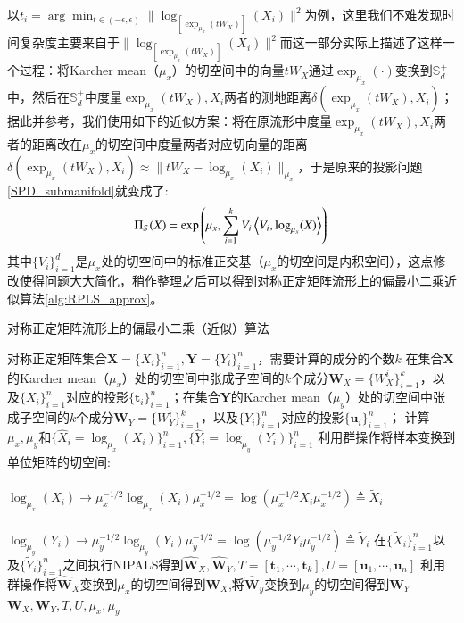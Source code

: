 以$t_i=\arg\min_{t \in (-\epsilon,\epsilon)}\|\log_{[\exp_{\mu_x}(tW_X)]}(X_i)\|^2$为例，这里我们不难发现时间复杂度主要来自于$\|\log_{[\exp_{\mu_x}(tW_X)]}(X_i)\|^2$而这一部分实际上描述了这样一个过程：将Karcher mean（$\mu_x$）的切空间中的向量$tW_X$通过$\exp_{\mu_x}(\cdot)$变换到$\mathbb{S}_{d}^{+}$中，然后在$\mathbb{S}_{d}^{+}$中度量$\exp_{\mu_x}(tW_X),X_i$两者的测地距离$\delta(\exp_{\mu_x}(tW_X),X_i)$；据此并参考\cite{PGA}，我们使用如下的近似方案：将在原流形中度量$\exp_{\mu_x}(tW_X),X_i$两者的距离改在$\mu_x$的切空间中度量两者对应切向量的距离$\delta(\exp_{\mu_x}(tW_X),X_i)\approx \|tW_X-\log_{\mu_x}(X_i)\|_{\mu_x}$，于是原来的投影问题\ref{SPD_submanifold}就变成了:
\begin{equation}
\label{tangent_approxiamte}
\Pi_{S}(X)=\exp\left(\mu_x,\sum_{i=1}^{k}V_i\left<V_i,\log_{\mu_x}(X)\right>\right)\\
\end{equation}
其中$\{V_i\}_{i=1}^{d}$是$\mu_x$处的切空间中的标准正交基（$\mu_x$的切空间是内积空间），这点修改使得问题大大简化，稍作整理之后可以得到对称正定矩阵流形上的偏最小二乘近似算法\ref{alg:RPLS_approx}。
\begin{algorithm}[htb]
\caption{对称正定矩阵流形上的偏最小二乘（近似）算法}
\label{alg:RPLS_approx}
\begin{algorithmic}[1]
\REQUIRE 对称正定矩阵集合$\bm{X}=\{X_i\}_{i=1}^{n},\bm{Y}=\{Y_i\}_{i=1}^{n}$，需要计算的成分的个数$k$
\ENSURE 在集合$\bm{X}$的Karcher mean（$\mu_x$）处的切空间中张成子空间的$k$个成分$\bm{W}_{X}=\{W_{X}^{i}\}_{i=1}^{k}$，以及$\{X_i\}_{i=1}^{n}$对应的投影$\{\bm{t}_i\}_{i=1}^{n}$；在集合$\bm{Y}$的Karcher mean（$\mu_y$）处的切空间中张成子空间的$k$个成分$\bm{W}_{Y}=\{W_{Y}^{i}\}_{i=1}^{k}$，以及$\{Y_i\}_{i=1}^{n}$对应的投影$\{\bm{u}_i\}_{i=1}^{n}$；
\STATE 计算$\mu_x, \mu_y$和$\{\hat{X}_i=\log_{\mu_{x}}(X_i)\}_{i=1}^{n}, \{\hat{Y}_i=\log_{\mu_{y}}(Y_i)\}_{i=1}^{n}$
\STATE 利用群操作将样本变换到单位矩阵的切空间:\\
~~~~~~~~~~~~~~~~~~~$\log_{\mu_{x}}(X_i)\rightarrow \mu_{x}^{-1/2}\log_{\mu_{x}}(X_i)\mu_{x}^{-1/2}=\log(\mu_{x}^{-1/2}X_i\mu_{x}^{-1/2})\triangleq \tilde{X}_i$\\
~~~~~~~~~~~~~~~~~~~$\log_{\mu_{y}}(Y_i)\rightarrow \mu_{y}^{-1/2}\log_{\mu_{y}}(Y_i)\mu_{y}^{-1/2}=\log(\mu_{y}^{-1/2}Y_i\mu_{y}^{-1/2})\triangleq \tilde{Y}_i$
\STATE 在$\{\tilde{X}_{i}\}_{i=1}^{n}$以及$\{\tilde{Y}_{i}\}_{i=1}^{n}$之间执行NIPALS\cite{pls_NIPALS}得到$\hat{\bm{W}}_X,\hat{\bm{W}}_Y,T=[\bm{t}_1,\cdots,\bm{t}_k],U=[\bm{u}_1,\cdots,\bm{u}_n]$
\STATE 利用群操作将$\hat{\bm{W}}_X$变换到$\mu_x$的切空间得到$\bm{W}_X$,将$\hat{\bm{W}}_y$变换到$\mu_y$的切空间得到$\bm{W}_Y$
\RETURN $\bm{W}_X,\bm{W}_Y,T,U,\mu_x,\mu_y$
\end{algorithmic}
\end{algorithm}

